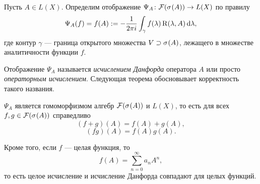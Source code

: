 Пусть $A \in L(X)$. Определим отображение $\Psi_A \colon \mathcal F(\spectrum{A}) \to L(X)$ по правилу
\[ \Psi_A(f) = f(A) 
    := -\frac{1}{2\pi i} \int_{\gamma} f(\lambda) \operatorname{R}(\lambda, A) \,\mathrm{d} \lambda, \]
где контур $\gamma$ --- граница открытого множества $V \supset \spectrum{A}$, лежащего в множестве
аналитичности функции $f$.

Отображение $\Psi_A$ называется \emph{исчислением Данфорда} оператора $A$ или просто
\emph{операторным исчислением}. Следующая теорема обосновывает корректность такого названия.

\begin{theorem}
    $\Psi_A$ является гомоморфизмом алгебр $\mathcal F(\spectrum{A})$ и $L(X)$, то есть для всех
    $f, g \in \mathcal F(\spectrum{A})$ справедливо
    \[ (f+g)(A) = f(A) + g(A), \]
    \[ (fg)(A) = f(A)g(A). \]

    Кроме того, если $f$ --- целая функция, то
    \[ f(A) = \sum_{n=0}^\infty a_n A^n, \]
    то есть целое исчисление и исчисление Данфорда совпадают для целых функций.
\end{theorem}

